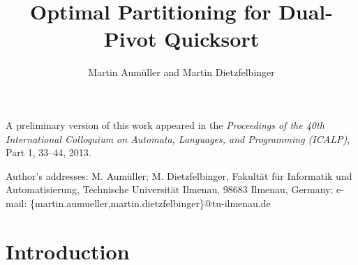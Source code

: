 \documentclass[prodmode,acmtalg]{acmsmall}
\title{Optimal Partitioning for Dual-Pivot Quicksort}
\author{Martin Aum\"{u}ller and Martin
Dietzfelbinger \affil{Technische Universität Ilmenau}}
\begin{document}
\begin{bottomstuff}
    A preliminary version of this work appeared in the \emph{Proceedings of the 40th International Colloquium
    on Automata, Languages, and Programming (ICALP)}, Part 1, 33--44, 2013.

    Author's addresses: M. Aum\"{u}ller; M. Dietzfelbinger, Fakultät für Informatik und Automatisierung, Techni\-sche 
    Universität Ilmenau, 98683 Ilmenau, Germany; e-mail: \{martin.aumueller,martin.dietzfelbinger\}@tu-ilmenau.de
\end{bottomstuff}
\maketitle
    

\section{Introduction}\label{sec:introduction}
\end{document}
